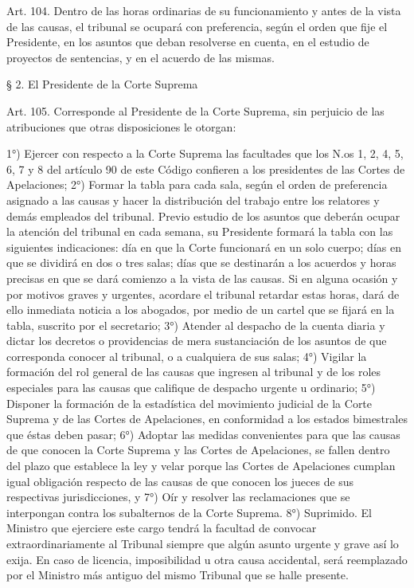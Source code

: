     Art. 104. Dentro de las horas ordinarias de su funcionamiento y antes de la vista de las causas, el tribunal se ocupará con preferencia, según el orden que fije el Presidente, en los asuntos que deban resolverse en cuenta, en el estudio de proyectos de sentencias, y en el acuerdo de las mismas.

    § 2. El Presidente de la Corte Suprema


    Art. 105. Corresponde al Presidente de la Corte Suprema, sin perjuicio de las atribuciones que otras disposiciones le otorgan:

    1°) Ejercer con respecto a la Corte Suprema las facultades que los N.os 1, 2, 4, 5, 6, 7 y 8 del artículo 90 de este Código confieren a los presidentes de las Cortes de Apelaciones;
    2°) Formar la tabla para cada sala, según el orden de preferencia asignado a las causas y hacer la distribución del trabajo entre los relatores y demás empleados del tribunal.
    Previo estudio de los asuntos que deberán ocupar la atención del tribunal en cada semana, su Presidente formará la tabla con las siguientes indicaciones: día en que la Corte funcionará en un solo cuerpo; días en que se dividirá en dos o tres salas; días que se destinarán a los acuerdos y horas precisas en que se dará comienzo a la vista de las causas.
    Si en alguna ocasión y por motivos graves y urgentes, acordare el tribunal retardar estas horas, dará de ello inmediata noticia a los abogados, por medio de un cartel que se fijará en la tabla, suscrito por el secretario;
    3°) Atender al despacho de la cuenta diaria y dictar los decretos o providencias de mera sustanciación de los asuntos de que corresponda conocer al tribunal, o a cualquiera de sus salas;
    4°) Vigilar la formación del rol general de las causas que ingresen al tribunal y de los roles especiales para las causas que califique de despacho urgente u ordinario;
    5°) Disponer la formación de la estadística del movimiento judicial de la Corte Suprema y de las Cortes de Apelaciones, en conformidad a los estados bimestrales que éstas deben pasar;
    6°) Adoptar las medidas convenientes para que las causas de que conocen la Corte Suprema y las Cortes de Apelaciones, se fallen dentro del plazo que establece la ley y velar porque las Cortes de Apelaciones cumplan igual obligación respecto de las causas de que conocen los jueces de sus respectivas jurisdicciones, y
    7°) Oír y resolver las reclamaciones que se interpongan contra los subalternos de la Corte Suprema.
    8°) Suprimido.
    El Ministro que ejerciere este cargo tendrá la facultad de convocar extraordinariamente al Tribunal siempre que algún asunto urgente y grave así lo exija.
    En caso de licencia, imposibilidad u otra causa accidental, será reemplazado por el Ministro más antiguo del mismo Tribunal que se halle presente.



